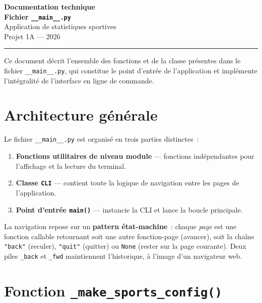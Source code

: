 \documentclass[12pt,a4paper]{article}
\begin{document}
\begin{titlepage}
    \centering
    \vspace*{3cm}
    {\huge\bfseries Documentation technique\\[0.5em]}
    {\Large\bfseries Fichier \texttt{\_\_main\_\_.py}\\[2em]}
    {\large Application de statistiques sportives\\[1em]}
    {\normalsize Projet 1A — 2026\\[3em]}
    \hrule
    \vspace{1em}
    {\small Ce document décrit l'ensemble des fonctions et de la classe
    présentes dans le fichier \texttt{\_\_main\_\_.py}, qui constitue le
    point d'entrée de l'application et implémente l'intégralité de
    l'interface en ligne de commande.}
\end{titlepage}

\tableofcontents
\newpage

\section{Architecture générale}

Le fichier \texttt{\_\_main\_\_.py} est organisé en trois parties
distinctes~:

\begin{enumerate}
    \item \textbf{Fonctions utilitaires de niveau module} — fonctions
    indépendantes pour l'affichage et la lecture du terminal.
    \item \textbf{Classe \texttt{CLI}} — contient toute la logique de
    navigation entre les pages de l'application.
    \item \textbf{Point d'entrée \texttt{main()}} — instancie la CLI
    et lance la boucle principale.
\end{enumerate}

La navigation repose sur un \textbf{pattern état-machine}~: chaque
\textit{page} est une fonction callable retournant soit une autre
fonction-page (avancer), soit la chaîne \texttt{"back"} (reculer),
\texttt{"quit"} (quitter) ou \texttt{None} (rester sur la page courante).
Deux piles \texttt{\_back} et \texttt{\_fwd} maintiennent l'historique,
à l'image d'un navigateur web.

\section{Fonction \texttt{\_make\_sports\_config()}}
\end{document}
